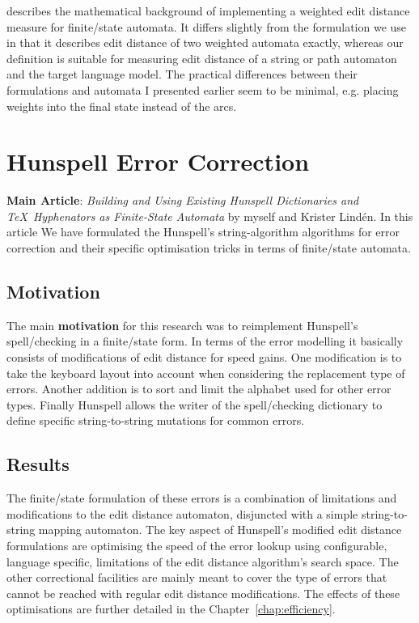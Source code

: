 \documentclass[officiallayout,final]{unihelcompling}
\begin{document}
\citet{mohri2003edit} describes the mathematical background of implementing a
weighted edit distance measure for finite\-/state automata. It differs slightly
from the formulation we use in that it describes edit distance of two weighted
automata exactly, whereas our definition is suitable for measuring edit
distance of a string or path automaton and the target language model. The
practical differences between their formulations and automata I presented
earlier seem to be minimal, e.g. placing weights into the final state instead
of the arcs.

\section{Hunspell Error Correction}
\label{sec:Hunspell-error}

\textbf{Main Article}: \emph{Building and Using Existing Hunspell Dictionaries
and \TeX\ Hyphenators as Finite-State Automata} by myself and Krister Lindén.
In this article We have formulated the Hunspell's string-algorithm algorithms for
error correction and their specific optimisation tricks in terms of
finite\-/state automata.

\subsection{Motivation}

The main \textbf{motivation} for this research was to reimplement Hunspell's
spell\-/checking in a finite\-/state form. In terms of the  error modelling it
basically consists of modifications of edit distance for speed gains. 
One modification is to take the keyboard layout
into account when considering the replacement type of errors. Another addition
is to sort and limit the alphabet used for other error types. Finally Hunspell
allows the writer of the spell\-/checking dictionary to define specific
string-to-string mutations for common errors.

\subsection{Results}

The finite\-/state formulation of these errors is a combination of limitations
and modifications to the edit distance automaton, disjuncted with a simple
string-to-string mapping automaton. The key aspect of Hunspell's modified
edit distance formulations are optimising the speed of the error lookup using
configurable, language specific, limitations of the edit distance algorithm's
search space. The other correctional facilities are mainly meant to cover the
type of errors that cannot be reached with regular edit distance modifications.
The effects of these optimisations are further detailed in the 
Chapter~\ref{chap:efficiency}.
\end{document}
